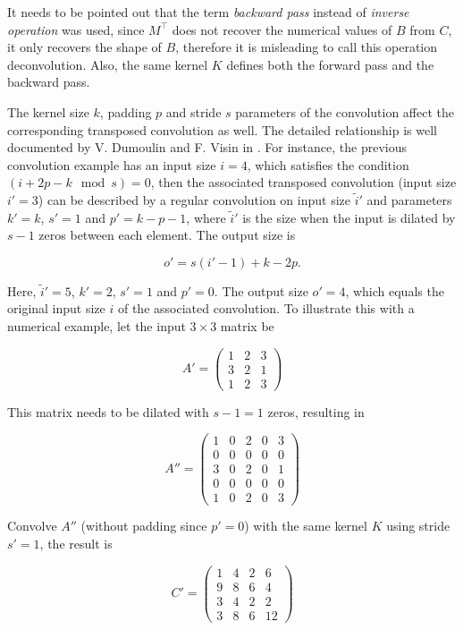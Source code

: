 It needs to be pointed out that the term \textit{backward pass} instead of \textit{inverse operation} was used,
since $M^\intercal$ does not recover the numerical values of $B$ from $C$, it only recovers the shape of $B$,
therefore it is misleading to call this operation deconvolution. Also, the same kernel $K$ defines both
the forward pass and the backward pass.

The kernel size $k$, padding $p$ and stride $s$ parameters of the convolution affect the corresponding
transposed convolution as well. The detailed relationship is well documented by V. Dumoulin and F. Visin in
\cite{dumoulin:conv_arithmetic}. For instance, the previous convolution example has an input size $i = 4$,
which satisfies the condition $(i + 2p - k \mod s) = 0$, then the associated transposed convolution
(input size $i' = 3$) can be described by a regular convolution on input size $\tilde{i}'$ and parameters
$k' = k$, $s' = 1$ and $p' = k - p - 1$,
where $\tilde{i}'$ is the size when the input is dilated by $s - 1$ zeros between each element. The output
size is

\begin{equation}
  o' = s(i' - 1) + k - 2p.
\end{equation}

Here, $\tilde{i}' = 5$, $k' = 2$, $s' = 1$ and $p' = 0$. The output size $o' = 4$, which equals the
original input size $i$ of the associated convolution. To illustrate this with a numerical example, let
the input $3 \times 3$ matrix be

$$
A' =
  \begin{pmatrix}
    1 & 2 & 3 \\
    3 & 2 & 1 \\
    1 & 2 & 3
  \end{pmatrix}
$$

This matrix needs to be dilated with $s - 1 = 1$ zeros, resulting in

$$
A'' =
  \begin{pmatrix}
    1 & 0 & 2 & 0 & 3 \\
    0 & 0 & 0 & 0 & 0 \\
    3 & 0 & 2 & 0 & 1 \\
    0 & 0 & 0 & 0 & 0 \\
    1 & 0 & 2 & 0 & 3
  \end{pmatrix}
$$

Convolve $A''$ (without padding since $p' = 0$) with the same kernel $K$ using stride $s' = 1$, the result
is

$$
C' =
  \begin{pmatrix}
    1 & 4 & 2 & 6 \\
    9 & 8 & 6 & 4 \\
    3 & 4 & 2 & 2 \\
    3 & 8 & 6 & 12
  \end{pmatrix}
$$

